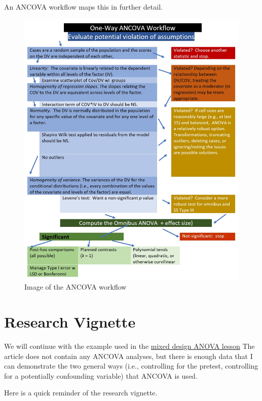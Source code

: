 \documentclass[
  11pt,
]{book}
\begin{document}
An ANCOVA workflow maps this in further detail.

\begin{figure}
\centering
\includegraphics{images/ANCOVA/wf_ANCOVA.jpg}
\caption{Image of the ANCOVA workflow}
\end{figure}

\hypertarget{research-vignette-8}{%
\section{Research Vignette}\label{research-vignette-8}}

We will continue with the example used in the \protect\hyperlink{Mixed}{mixed design ANOVA lesson} The article does not contain any ANCOVA analyses, but there is enough data that I can demonstrate the two general ways (i.e., controlling for the pretest, controlling for a potentially confounding variable) that ANCOVA is used.

Here is a quick reminder of the research vignette.
\end{document}
